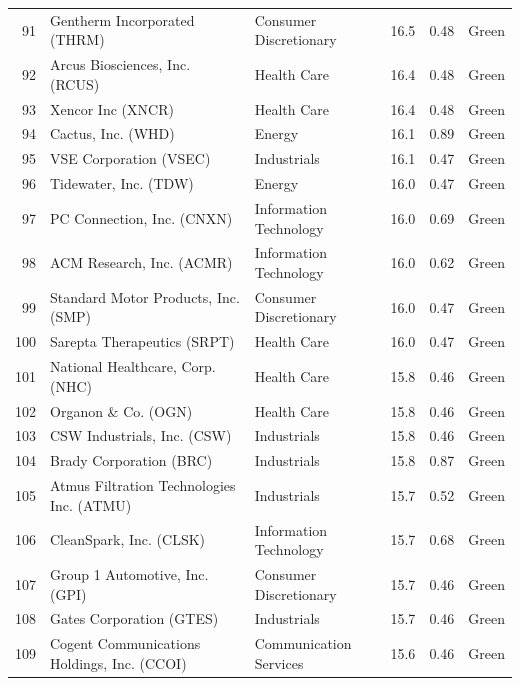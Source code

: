 \documentclass[11pt,a4paper]{article}
\begin{document}
{\begin{longtable}{r p{4.6cm} p{3cm} r r l}
91 & Gentherm Incorporated (THRM) & Consumer Discretionary & 16.5 & 0.48 & \cellcolor[HTML]{C6EFCE}Green \\
92 & Arcus Biosciences, Inc. (RCUS) & Health Care & 16.4 & 0.48 & \cellcolor[HTML]{C6EFCE}Green \\
93 & Xencor Inc (XNCR) & Health Care & 16.4 & 0.48 & \cellcolor[HTML]{C6EFCE}Green \\
94 & Cactus, Inc. (WHD) & Energy & 16.1 & 0.89 & \cellcolor[HTML]{C6EFCE}Green \\
95 & VSE Corporation (VSEC) & Industrials & 16.1 & 0.47 & \cellcolor[HTML]{C6EFCE}Green \\
96 & Tidewater, Inc. (TDW) & Energy & 16.0 & 0.47 & \cellcolor[HTML]{C6EFCE}Green \\
97 & PC Connection, Inc. (CNXN) & Information Technology & 16.0 & 0.69 & \cellcolor[HTML]{C6EFCE}Green \\
98 & ACM Research, Inc. (ACMR) & Information Technology & 16.0 & 0.62 & \cellcolor[HTML]{C6EFCE}Green \\
99 & Standard Motor Products, Inc. (SMP) & Consumer Discretionary & 16.0 & 0.47 & \cellcolor[HTML]{C6EFCE}Green \\
100 & Sarepta Therapeutics (SRPT) & Health Care & 16.0 & 0.47 & \cellcolor[HTML]{C6EFCE}Green \\
101 & National Healthcare, Corp. (NHC) & Health Care & 15.8 & 0.46 & \cellcolor[HTML]{C6EFCE}Green \\
102 & Organon \& Co. (OGN) & Health Care & 15.8 & 0.46 & \cellcolor[HTML]{C6EFCE}Green \\
103 & CSW Industrials, Inc. (CSW) & Industrials & 15.8 & 0.46 & \cellcolor[HTML]{C6EFCE}Green \\
104 & Brady Corporation (BRC) & Industrials & 15.8 & 0.87 & \cellcolor[HTML]{C6EFCE}Green \\
105 & Atmus Filtration Technologies Inc. (ATMU) & Industrials & 15.7 & 0.52 & \cellcolor[HTML]{C6EFCE}Green \\
106 & CleanSpark, Inc. (CLSK) & Information Technology & 15.7 & 0.68 & \cellcolor[HTML]{C6EFCE}Green \\
107 & Group 1 Automotive, Inc. (GPI) & Consumer Discretionary & 15.7 & 0.46 & \cellcolor[HTML]{C6EFCE}Green \\
108 & Gates Corporation (GTES) & Industrials & 15.7 & 0.46 & \cellcolor[HTML]{C6EFCE}Green \\
109 & Cogent Communications Holdings, Inc. (CCOI) & Communication Services & 15.6 & 0.46 & \cellcolor[HTML]{C6EFCE}Green \\

\end{longtable}}
\end{document}
